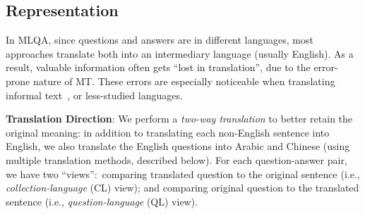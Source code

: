 \documentclass{sig-alternate-05-2015}
\newcommand{\red}[1]{\textcolor{red}{#1}}
\begin{document}

\subsection{Representation}\label{sec:repr}


In MLQA, since questions and answers are in different languages, most approaches translate both 
into an intermediary language (usually English). As a result, valuable information often gets ``lost in translation'', 
due to the error-prone nature of MT. These errors are especially noticeable when translating informal
text~\cite{Wees:2015aa}, or less-studied languages.

\textbf{Translation Direction}:
We perform a \emph{two-way translation} to better retain the original meaning:
in addition to translating each non-English sentence into English, 
we also translate the English questions into Arabic and Chinese (using multiple translation methods, described 
below). For each question-answer pair, we have two ``views'':\ comparing translated question to the 
original sentence (i.e., {\em collection-language} (CL) view); and comparing original question to the 
translated sentence (i.e., {\em question-language} (QL) view). 

\end{document}
